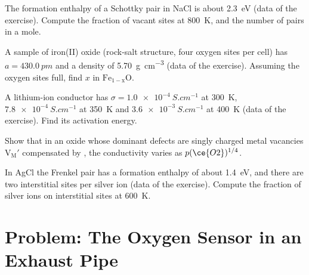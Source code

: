 \begin{exercise}[$\star\star$]\label{exo:b3:solid-state:8}
The formation enthalpy of a Schottky pair in NaCl is about \qty{2.3}{eV} (data of the
exercise). Compute the fraction of vacant sites at \qty{800}{K}, and the number of
pairs in a mole.
\end{exercise}

\begin{exercise}[$\star\star$]\label{exo:b3:solid-state:9}
A sample of iron(II) oxide (rock-salt structure, four oxygen sites per cell) has
$a = \qty{430.0}{pm}$ and a density of \qty{5.70}{g.cm^{-3}} (data of the exercise). Assuming
the oxygen sites full, find $x$ in $\mathrm{Fe_{1-x}O}$.
\end{exercise}

\begin{exercise}[$\star\star\star$]\label{exo:b3:solid-state:10}
A lithium-ion conductor has $\sigma = \qty{1.0e-4}{S.cm^{-1}}$ at \qty{300}{K}, $\qty{7.8e-4}{S.cm^{-1}}$ at \qty{350}{K} and
$\qty{3.6e-3}{S.cm^{-1}}$ at \qty{400}{K} (data of the exercise). Find its activation energy.
\end{exercise}

\begin{exercise}[$\star\star\star$]\label{exo:b3:solid-state:11}
Show that in an oxide whose dominant defects are singly charged metal vacancies
$\mathrm{V_M'}$ compensated by , the conductivity varies as $p(\ce{O2})^{1/4}$.
\end{exercise}

\begin{exercise}[$\star\star\star$]\label{exo:b3:solid-state:12}
In AgCl the Frenkel pair has a formation enthalpy of about \qty{1.4}{eV}, and there are
two interstitial sites per silver ion (data of the exercise). Compute the fraction
of silver ions on interstitial sites at \qty{600}{K}.
\end{exercise}

\section{Problem: The Oxygen Sensor in an Exhaust Pipe}

